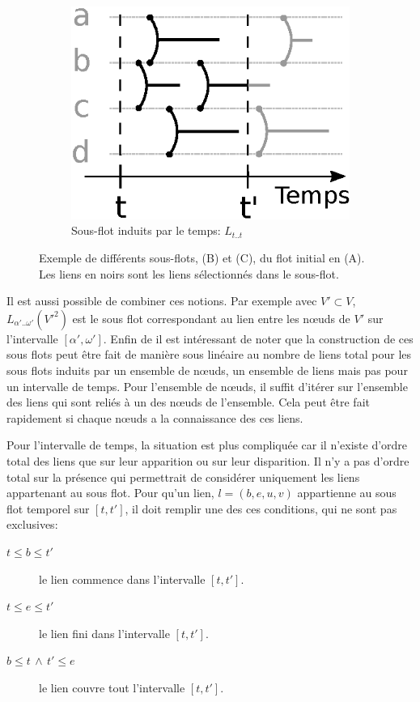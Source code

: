 \begin{figure}[]
	\begin{subfigure}{0.2\linewidth}
		\includegraphics[width=\linewidth]{img/Intro/sous_flots2.eps}\hfill
		\caption{Sous-flot induits par le temps:  $L_{t..t}$}
		\label{fig:exemple_sous_flot2}	
	\end{subfigure}
	\caption{Exemple de différents sous-flots, (B) et (C), du flot initial en (A). Les liens en noirs sont les liens sélectionnés dans le sous-flot. }
\label{fig:exemple_sous_flot}
\end{figure}
Il est aussi possible de combiner ces notions.
Par exemple avec $V' \subset V$, $L_{\alpha'..\omega'}(V'^2)$ est le sous flot correspondant au lien entre les n\oe uds de $V'$ sur l'intervalle $[\alpha', \omega']$.
\bigskip
Enfin de il est intéressant de noter que la construction de ces sous flots peut être fait de manière sous linéaire au nombre de liens total pour les sous flots induits par un ensemble de n\oe uds, un ensemble de liens mais pas pour un intervalle de temps.
Pour l'ensemble de n\oe uds, il suffit d'itérer sur l'ensemble des liens qui sont reliés à un des n\oe uds de l'ensemble.
Cela peut être fait rapidement si chaque n\oe uds a la connaissance des ces liens.

Pour l'intervalle de temps, la situation est plus compliquée car il n'existe d'ordre total des liens que sur leur apparition ou sur leur disparition.
Il n'y a pas d'ordre total sur la présence qui permettrait de considérer uniquement les liens appartenant au sous flot.
Pour qu'un lien, $l= (b,e,u,v)$ appartienne au sous flot temporel sur $[t,t']$, il doit remplir une des ces conditions, qui ne sont pas exclusives:
\begin{description}
\item[$t \leq b \leq t'$] le lien commence dans l'intervalle $[t,t']$.
\item[$t \leq e \leq t'$] le lien fini dans l'intervalle $[t,t']$.
\item[$ b \leq t \, \wedge \, t' \leq e$] le lien couvre tout l'intervalle $[t,t']$.
\end{description}

